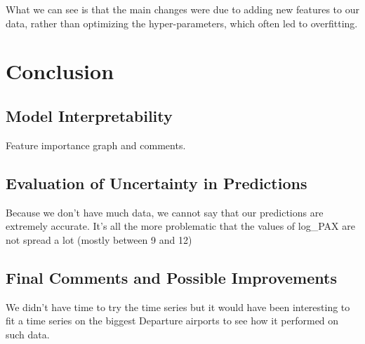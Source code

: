\documentclass[a4paper,12pt,twoside]{article}
\begin{document}
What we can see is that the main changes were due to adding new features to our data, rather than optimizing the hyper-parameters, which often led to overfitting.

\section{Conclusion}

\subsection{Model Interpretability}

Feature importance graph and comments.

\subsection{Evaluation of Uncertainty in Predictions}

Because we don't have much data, we cannot say that our predictions are extremely accurate. It's all the more problematic that the values of log\_PAX are not spread a lot (mostly between 9 and 12)

\subsection{Final Comments and Possible Improvements}

We didn't have time to try the time series but it would have been interesting to fit a time series on the biggest Departure airports to see how it performed on such data.
\end{document}

